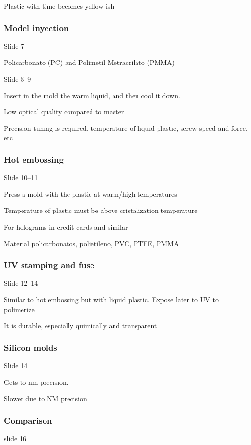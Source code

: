 \documentclass[../main/main.tex]{subfiles}
\begin{document}
Plastic with time becomes yellow-ish

\subsubsection{Model inyection}

Slide 7

Policarbonato (PC) and Polimetil Metracrilato (PMMA)


Slide 8--9

Insert in the mold the warm liquid, and then cool it down.

Low optical quality compared to master

Precision tuning is required, temperature of liquid plastic, screw speed and force, etc

\subsubsection{Hot embossing}

Slide 10--11

Press a mold with the plastic at warm/high temperatures

Temperature of plastic must be above cristalization temperature

For holograms in credit cards and similar

Material policarbonatos, polietileno, PVC, PTFE, PMMA

\subsubsection{UV stamping and fuse}

Slide 12--14

Similar to hot embossing but with liquid plastic. Expose later to UV to polimerize

It is durable, especially quimically and transparent

\subsubsection*{Silicon molds}

Slide 14

Gets to nm precision.

Slower due to NM precision

\subsubsection*{Comparison}
slide 16
\end{document}
